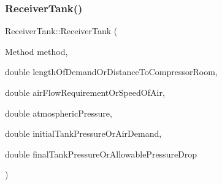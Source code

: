 \subsubsection{\texorpdfstring{Receiver\+Tank()}{ReceiverTank()}\hspace{0.1cm}{\footnotesize\ttfamily [5/9]}}
{\footnotesize\ttfamily Receiver\+Tank\+::\+Receiver\+Tank (\begin{DoxyParamCaption}\item[{Method}]{method,  }\item[{double}]{length\+Of\+Demand\+Or\+Distance\+To\+Compressor\+Room,  }\item[{double}]{air\+Flow\+Requirement\+Or\+Speed\+Of\+Air,  }\item[{double}]{atmospheric\+Pressure,  }\item[{double}]{initial\+Tank\+Pressure\+Or\+Air\+Demand,  }\item[{double}]{final\+Tank\+Pressure\+Or\+Allowable\+Pressure\+Drop }\end{DoxyParamCaption})}

